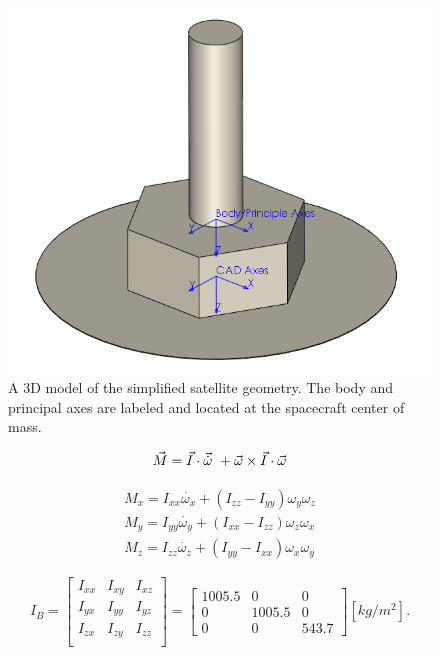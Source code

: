 \begin{figure}[H]
\centering
\includegraphics[scale=0.7]{Images/WMAP_CAD4.PNG}
\caption{A 3D model of the simplified satellite geometry. The body and principal axes are labeled and located at the spacecraft center of mass.}
\label{CAD model with frames}
\end{figure}


\begin{equation}
\vec{M} = \vec{I} \cdot \vec{\dot{\omega}}\ + \vec{\omega} \times \vec{I} \cdot \vec{\omega} \\ 
\end{equation}   

\begin{eqnarray}
M_x = I_{xx} \dot{\omega_x} + (I_{zz} - I_{yy})\omega_y \omega_z \nonumber \\
M_y = I_{yy} \dot{\omega_y} + (I_{xx} - I_{zz})\omega_z \omega_x \\
M_z = I_{zz} \dot{\omega_z} + (I_{yy} - I_{xx})\omega_x \omega_y \nonumber
\end{eqnarray}

\begin{equation}
I_{B} =
\begin{bmatrix} 
I_{xx} & I_{xy} & I_{xz} \\
I_{yx} & I_{yy} & I_{yz} \\ 
I_{zx} & I_{zy} & I_{zz} \\
\end{bmatrix}
=
\begin{bmatrix}
1005.5 & 0 & 0 \\
0 & 1005.5 & 0 \\ 
0 & 0 & 543.7
\end{bmatrix}
[kg/m^2].
\end{equation}

